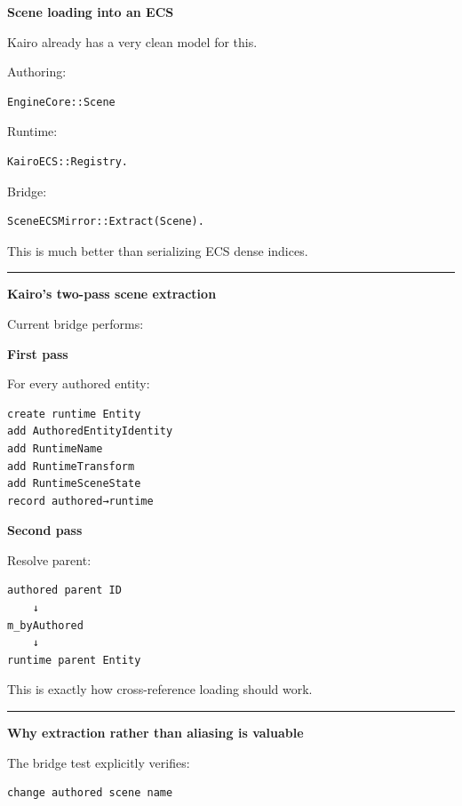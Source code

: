 \textbf{Scene loading into an ECS}

Kairo already has a very clean model for this.

Authoring:

\begin{verbatim}
EngineCore::Scene
\end{verbatim}

Runtime:

\begin{verbatim}
KairoECS::Registry.
\end{verbatim}

Bridge:

\begin{verbatim}
SceneECSMirror::Extract(Scene).
\end{verbatim}

This is much better than serializing ECS dense indices.

\begin{center}\rule{0.5\linewidth}{0.5pt}\end{center}

\textbf{Kairo's two-pass scene extraction}

Current bridge performs:

\textbf{First pass}

For every authored entity:

\begin{verbatim}
create runtime Entity
add AuthoredEntityIdentity
add RuntimeName
add RuntimeTransform
add RuntimeSceneState
record authored→runtime
\end{verbatim}

\textbf{Second pass}

Resolve parent:

\begin{verbatim}
authored parent ID
    ↓
m_byAuthored
    ↓
runtime parent Entity
\end{verbatim}

This is exactly how cross-reference loading should work.

\begin{center}\rule{0.5\linewidth}{0.5pt}\end{center}

\textbf{Why extraction rather than aliasing is valuable}

The bridge test explicitly verifies:

\begin{verbatim}
change authored scene name
\end{verbatim}

